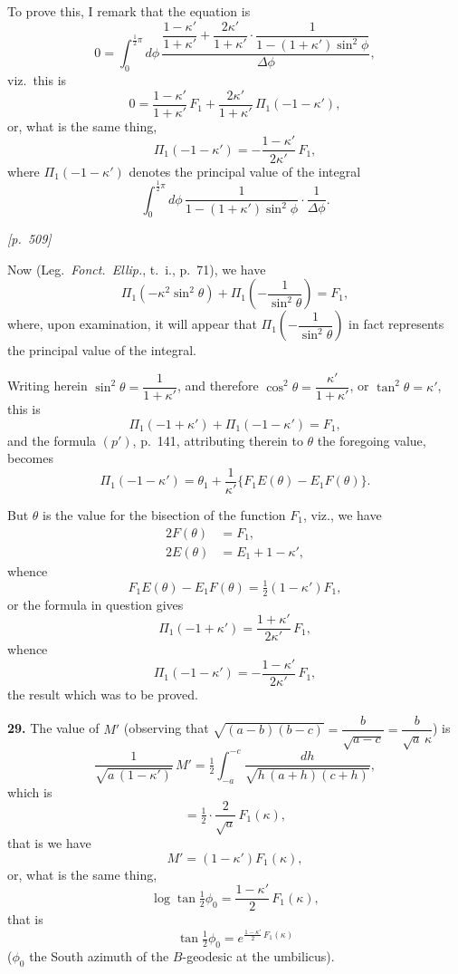 \documentclass[11pt]{article}
\begin{document}
To prove this, I remark that the equation is
\[
0=\int_{0}^{\tfrac{1}{2}\pi}d\phi
\,\frac{\dfrac{1-\kappa'}{1+\kappa'}+\dfrac{2\kappa'}{1+\kappa'}\cdot\dfrac{1}{1-(1+\kappa')\sin^{2}\phi}}
{\Delta\phi},
\]
viz.\ this is
\[
0=\frac{1-\kappa'}{1+\kappa'}\,F_{1}+\frac{2\kappa'}{1+\kappa'}\,\Pi_{1}(-1-\kappa'),
\]
or, what is the same thing,
\[
\Pi_{1}(-1-\kappa')=-\frac{1-\kappa'}{2\kappa'}\,F_{1},
\]
where $\Pi_{1}(-1-\kappa')$ denotes the principal value of the integral
\[
\int_{0}^{\tfrac{1}{2}\pi}d\phi\,\frac{1}{1-(1+\kappa')\sin^{2}\phi}\cdot\frac{1}{\Delta\phi}.
\]

\medskip

\noindent\textit{[p.~509]}

\medskip

Now (Leg.\ \textit{Fonct.\ Ellip.}, t.\ i., p.~71), we have
\[
\Pi_{1}(-\kappa^{2}\sin^{2}\theta)+\Pi_{1}\!\left(-\frac{1}{\sin^{2}\theta}\right)=F_{1},
\]
where, upon examination, it will appear that $\Pi_{1}\!\left(-\dfrac{1}{\sin^{2}\theta}\right)$
in fact represents the principal value of the integral.

Writing herein $\sin^{2}\theta=\dfrac{1}{1+\kappa'}$, and therefore
$\cos^{2}\theta=\dfrac{\kappa'}{1+\kappa'}$, or $\tan^{2}\theta=\kappa'$,
this is
\[
\Pi_{1}(-1+\kappa')+\Pi_{1}(-1-\kappa')=F_{1},
\]
and the formula $(p')$, p.~141, attributing therein to $\theta$ the
foregoing value, becomes
\[
\Pi_{1}(-1-\kappa')=\theta_{1}+\frac{1}{\kappa'}\{F_{1}E(\theta)-E_{1}F(\theta)\}.
\]

But $\theta$ is the value for the bisection of the function $F_{1}$, viz.,
we have
\begin{align*}
2F(\theta) &= F_{1},\\
2E(\theta) &= E_{1}+1-\kappa',
\end{align*}
whence
\[
F_{1}E(\theta)-E_{1}F(\theta)=\tfrac{1}{2}(1-\kappa')F_{1},
\]
or the formula in question gives
\[
\Pi_{1}(-1+\kappa')=\frac{1+\kappa'}{2\kappa'}\,F_{1},
\]
whence
\[
\Pi_{1}(-1-\kappa')=-\frac{1-\kappa'}{2\kappa'}\,F_{1},
\]
the result which was to be proved.

\textbf{29.} The value of $M'$ (observing that
$\sqrt{(a-b)(b-c)}=\dfrac{b}{\sqrt{a-c}}=\dfrac{b}{\sqrt{a}\,\kappa}$) is
\[
\frac{1}{\sqrt{a\,(1-\kappa')}}\,M'=\tfrac{1}{2}\int_{-a}^{-c}\frac{dh}{\sqrt{h\,(a+h)(c+h)}},
\]
which is
\[
=\tfrac{1}{2}\cdot\frac{2}{\sqrt{a}}\,F_{1}(\kappa),
\]
that is we have
\[
M'=(1-\kappa')F_{1}(\kappa),
\]
or, what is the same thing,
\[
\log\tan\tfrac{1}{2}\phi_{0}=\frac{1-\kappa'}{2}\,F_{1}(\kappa),
\]
that is
\[
\tan\tfrac{1}{2}\phi_{0}=e^{\tfrac{1-\kappa'}{2}\,F_{1}(\kappa)}
\]
($\phi_{0}$ the South azimuth of the $B$-geodesic at the umbilicus).
\end{document}
